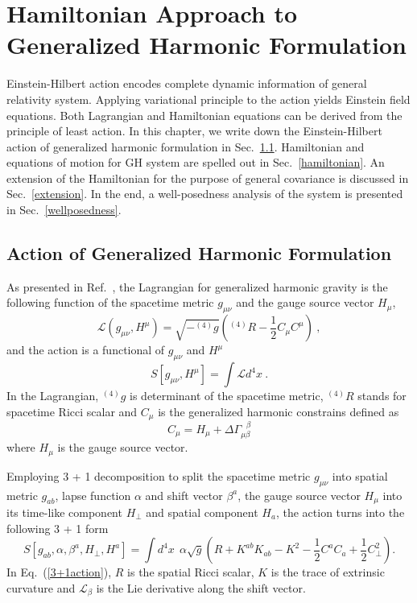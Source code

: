 \chapter{Hamiltonian Approach to Generalized Harmonic Formulation}\label{chapterhamiltonian}
Einstein-Hilbert action encodes complete dynamic information of general relativity system. Applying variational principle to the action yields Einstein field equations. Both Lagrangian and Hamiltonian equations can be derived from the principle of least action. In this chapter, we write down the Einstein-Hilbert action of generalized harmonic formulation in Sec.~\ref{action}. Hamiltonian and equations of motion for GH system are spelled out in Sec.~\ref{hamiltonian}. An extension of the Hamiltonian for the purpose of general covariance is discussed in Sec.~\ref{extension}. In the end, a well-posedness analysis of the system is presented in Sec.~\ref{wellposedness}. 
\section{Action of Generalized Harmonic Formulation}\label{action}
As presented in Ref.~\cite{Brown:2010rya}, the Lagrangian for generalized harmonic gravity is the following function of the spacetime metric $g_{\mu\nu}$ and the gauge source vector $H_{\mu}$, 
\begin{equation}
\mathscr{L}\left(g_{\mu\nu}, H^{\mu}\right) = \sqrt{-^{(4)}g} \left(^{(4)}R - \frac{1}{2}C_{\mu}C^{\mu}\right) \ , 
\end{equation}
and the action is a functional of $g_{\mu\nu}$ and $H^{\mu}$
\begin{equation}\label{action}
S\left[g_{\mu\nu}, H^{\mu}\right] = \int \mathscr{L} d^{4}x \ .
\end{equation}
In the Lagrangian, $^{(4)}g$ is determinant of the spacetime metric, $^{(4)}R$ stands for spacetime Ricci scalar and $C_{\mu}$ is the generalized harmonic constrains defined as
\begin{equation}
C_{\mu} = H_{\mu} + \Delta \Gamma^{~~~\beta}_{\mu\beta}
\end{equation}
where $H_{\mu}$ is the gauge source vector. 

Employing 3 + 1 decomposition to split the spacetime metric $g_{\mu\nu}$ into spatial metric $g_{ab}$, lapse function $\alpha$ and shift vector $\beta^{a}$, the gauge source vector $H_{\mu}$ into its time-like component $H_{\perp}$ and spatial component $H_{a}$, the action turns into the following 3 + 1 form
\begin{equation}\label{3+1action}
S\left[g_{ab}, \alpha, \beta^{a}, H_{\perp}, H^{a}\right] = \int d^{4}x~~\alpha \sqrt{g} \left( R + K^{ab}K_{ab} - K^{2} - \frac{1}{2}C^{a}C_{a} + \frac{1}{2}C_{\perp}^{2}\right).
\end{equation}
In Eq.~(\ref{3+1action}), $R$ is the spatial Ricci scalar, $K$ is the trace of extrinsic curvature and $\mathcal{L}_{\beta}$ is the Lie derivative along the shift vector. 

